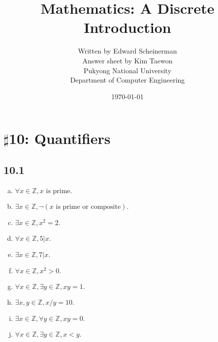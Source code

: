 \documentclass{article}
\title{Mathematics: A Discrete Introduction}
\author{Written by Edward Scheinerman\\Answer sheet by Kim Taewon\\Pukyong National University\\Department of Computer Engineering}
\date{\today}
\begin{document}
\maketitle

\section*{$\sharp$10: Quantifiers}
\subsection*{10.1}

\begin{enumerate}[a.]
    \item $\forall x \in \mathbb{Z}, x \textrm{ is prime}.$
    \item $\exists x \in \mathbb{Z}, \neg(x\textrm{ is prime or composite}).$
    \item $\exists x \in \mathbb{Z}, x^2=2.$
    \item $\forall x \in \mathbb{Z}, 5|x.$
    \item $\exists x \in \mathbb{Z}, 7|x.$
    \item $\forall x \in \mathbb{Z}, x^2 > 0.$
    \item $\forall x \in \mathbb{Z}, \exists y \in \mathbb{Z}, xy = 1.$
    \item $\exists x,y \in \mathbb{Z}, x/y = 10.$
    \item $\exists x \in \mathbb{Z}, \forall y \in \mathbb{Z}, xy = 0.$
    \item $\forall x \in \mathbb{Z}, \exists y \in \mathbb{Z}, x < y.$
\end{enumerate}
\end{document}
